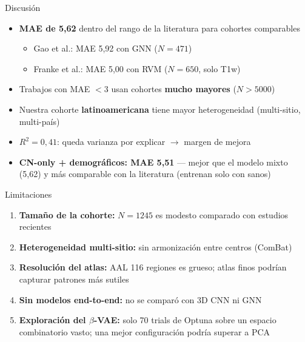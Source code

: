 \documentclass[aspectratio=169, 11pt]{beamer}
\newcommand{\highlight}[1]{\textcolor{uncaccent}{\textbf{#1}}}
\begin{document}
\begin{frame}{Discusión}
  \begin{itemize}
    \item \textbf{MAE de 5,62} dentro del rango de la literatura para cohortes comparables
    \begin{itemize}
      \item Gao et al.: MAE 5,92 con GNN ($N = 471$)
      \item Franke et al.: MAE 5,00 con RVM ($N = 650$, solo T1w)
    \end{itemize}

    \vspace{0.3cm}
    \item Trabajos con MAE $< 3$ usan cohortes \textbf{mucho mayores} ($N > 5000$)

    \vspace{0.3cm}
    \item Nuestra cohorte \highlight{latinoamericana} tiene mayor heterogeneidad (multi-sitio, multi-país)

    \vspace{0.3cm}
    \item $R^2 = 0{,}41$: queda varianza por explicar $\rightarrow$ margen de mejora

    \vspace{0.3cm}
    \item \highlight{CN-only + demográficos: MAE 5,51} --- mejor que el modelo mixto (5,62) y más comparable con la literatura (entrenan solo con sanos)
  \end{itemize}
\end{frame}

\begin{frame}{Limitaciones}
  \begin{enumerate}
    \item \textbf{Tamaño de la cohorte:} $N = 1245$ es modesto comparado con estudios recientes

    \vspace{0.25cm}
    \item \textbf{Heterogeneidad multi-sitio:} sin armonización entre centros (ComBat)

    \vspace{0.25cm}
    \item \textbf{Resolución del atlas:} AAL 116 regiones es grueso; atlas finos podrían capturar patrones más sutiles

    \vspace{0.25cm}
    \item \textbf{Sin modelos end-to-end:} no se comparó con 3D CNN ni GNN

    \vspace{0.25cm}
    \item \textbf{Exploración del $\beta$-VAE:} solo 70 trials de Optuna sobre un espacio combinatorio vasto; una mejor configuración podría superar a PCA
  \end{enumerate}
\end{frame}
\end{document}
